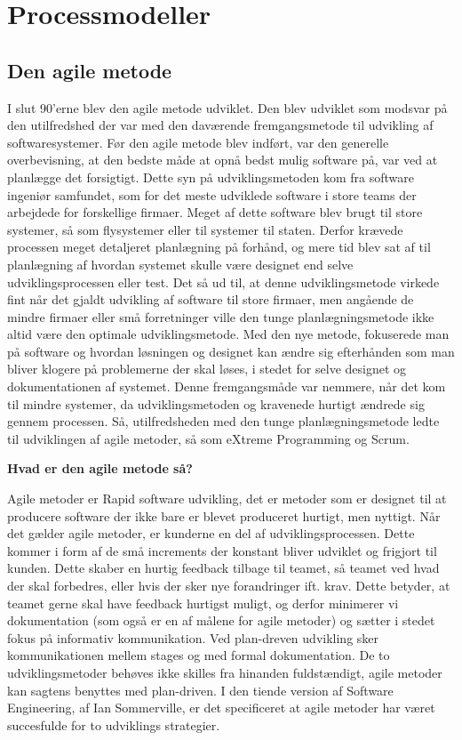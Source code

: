 \chapter{Processmodeller}\label{ch:processmodeller}

\section{Den agile metode}
I slut 90’erne blev den agile metode udviklet. Den blev udviklet som modsvar på den utilfredshed der var med den daværende fremgangsmetode til udvikling af softwaresystemer. Før den agile metode blev indført, var den generelle overbevisning, at den bedste måde at opnå bedst mulig software på, var ved at planlægge det forsigtigt. Dette syn på udviklingsmetoden kom fra software ingeniør samfundet, som for det meste udviklede software i store teams der arbejdede for forskellige firmaer. Meget af dette software blev brugt til store systemer, så som flysystemer eller til systemer til staten. Derfor krævede processen meget detaljeret planlægning på forhånd, og mere tid blev sat af til planlægning af hvordan systemet skulle være designet end selve udviklingsprocessen eller test. %
Det så ud til, at denne udviklingsmetode virkede fint når det gjaldt udvikling af software til store firmaer, men angående de mindre firmaer eller små forretninger ville den tunge planlægningsmetode ikke altid være den optimale udviklingsmetode. Med den nye metode, fokuserede man på software og hvordan løsningen og designet kan ændre sig efterhånden som man bliver klogere på problemerne der skal løses, i stedet for selve designet og dokumentationen af systemet. Denne fremgangsmåde var nemmere, når det kom til mindre systemer, da udviklingsmetoden og kravenede hurtigt ændrede sig gennem processen. \cite{Sommerville}
Så, utilfredsheden med den tunge planlægningsmetode ledte til udviklingen af agile metoder, så som eXtreme Programming og Scrum.


\textbf{Hvad er den agile metode så?}

Agile metoder er Rapid software udvikling, det er metoder som er designet til at producere software der ikke bare er blevet produceret hurtigt, men nyttigt. \cite{Sommerville} Når det gælder agile metoder, er kunderne en del af udviklingsprocessen. Dette kommer i form af de små increments der konstant bliver udviklet og frigjort til kunden. Dette skaber en hurtig feedback tilbage til teamet, så teamet ved hvad der skal forbedres, eller hvis der sker nye forandringer ift. krav. Dette betyder, at teamet gerne skal have feedback hurtigst muligt, og derfor minimerer vi dokumentation (som også er en af målene for agile metoder) og sætter i stedet fokus på informativ kommunikation. Ved plan-dreven udvikling sker kommunikationen mellem stages og med formal dokumentation. De to udviklingsmetoder behøves ikke skilles fra hinanden fuldstændigt, agile metoder kan sagtens benyttes med plan-driven. \cite{Sommerville}
I den tiende version af Software Engineering, af Ian Sommerville, er det specificeret at agile metoder har været succesfulde for to udviklings strategier.


